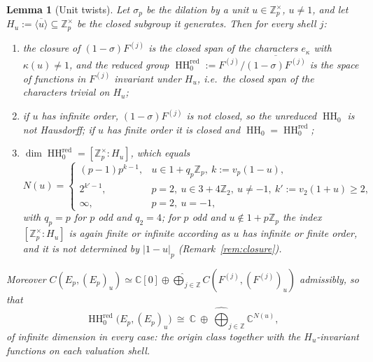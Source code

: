 \documentclass[11pt]{amsart}
\newtheorem{lemma}[theorem]{Lemma}
\theoremstyle{definition}
\theoremstyle{remark}
\newcommand{\C}{\mathbb C}
\newcommand{\Z}{\mathbb Z}
\newcommand{\HH}{\operatorname{HH}}
\begin{document}
\begin{lemma}[Unit twists]\label{lem:unit}
Let $\sigma_p$ be the dilation by a unit $u\in\Z_p^{\times}$, $u\ne1$, and let
$H_u:=\overline{\langle u\rangle}\subseteq\Z_p^{\times}$ be the closed subgroup
it generates.  Then for every shell $j$:
\begin{enumerate}
\item[(i)] the closure of $(1-\sigma)F^{(j)}$ is the closed span of the
characters $e_{\kappa}$ with $\kappa(u)\ne1$, and the \emph{reduced} group
$\HH_0^{\mathrm{red}}:=F^{(j)}/\overline{(1-\sigma)F^{(j)}}$ is the space of
functions in $F^{(j)}$ invariant under $H_u$, i.e.\ the closed span of the
characters trivial on $H_u$;
\item[(ii)] if $u$ has infinite order, $(1-\sigma)F^{(j)}$ is not closed, so
the unreduced $\HH_0$ is not Hausdorff; if $u$ has finite order it is closed
and $\HH_0=\HH_0^{\mathrm{red}}$;
\item[(iii)] $\dim\HH_0^{\mathrm{red}}=[\Z_p^{\times}:H_u]$, which equals
\[
N(u)=\begin{cases}(p-1)p^{k-1}, & u\in1+q_p\Z_p,\ k:=v_p(1-u),\\
2^{k'-1}, & p=2,\ u\in3+4\Z_2,\ u\ne-1,\ k':=v_2(1+u)\ge2,\\
\infty, & p=2,\ u=-1,
\end{cases}
\]
with $q_p=p$ for $p$ odd and $q_2=4$; for $p$ odd and $u\notin1+p\Z_p$ the
index $[\Z_p^{\times}:H_u]$ is again finite or infinite according as $u$ has
infinite or finite order, and it is not determined by $|1-u|_p$
(Remark~\ref{rem:closure}).
\end{enumerate}
Moreover $C(E_p,(E_p)_u)\simeq\C[0]\oplus\widehat\bigoplus_{j\in\Z}
C(F^{(j)},(F^{(j)})_u)$ admissibly, so that
\begin{equation}\label{eq:D2}
\HH_0^{\mathrm{red}}\bigl(E_p,(E_p)_{u}\bigr)\ \cong\ \C\ \oplus\
\widehat\bigoplus_{j\in\Z}\C^{N(u)},
\end{equation}
of infinite dimension in every case: the origin class together with the
$H_u$-invariant functions on each valuation shell.
\end{lemma}
\end{document}

